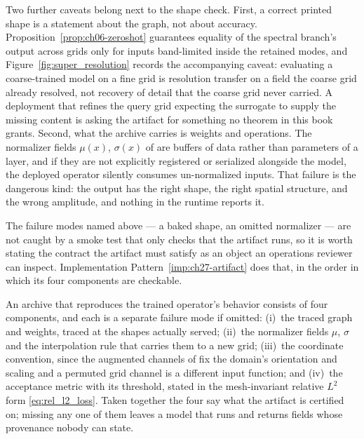 Two further caveats belong next to the shape check. First, a correct printed
shape is a statement about the graph, not about accuracy. Proposition~\ref{prop:ch06-zeroshot}
guarantees equality of the spectral branch's output across grids only for inputs
band-limited inside the retained modes, and Figure~\ref{fig:super_resolution}
records the accompanying caveat: evaluating a coarse-trained model on a fine grid
is resolution transfer on a field the coarse grid already resolved, not recovery
of detail that the coarse grid never carried. A deployment that refines the query
grid expecting the surrogate to supply the missing content is asking the artifact
for something no theorem in this book grants. Second, what the archive carries is
weights and operations. The normalizer fields $\mu(x)$, $\sigma(x)$ of
 are buffers of data
rather than parameters of a layer, and if they are not explicitly registered or
serialized alongside the model, the deployed operator silently consumes
un-normalized inputs. That failure is the dangerous kind: the output has the
right shape, the right spatial structure, and the wrong amplitude, and nothing in
the runtime reports it.

The failure modes named above --- a baked shape, an omitted normalizer --- are not
caught by a smoke test that only checks that the artifact runs, so it is worth
stating the contract the artifact must satisfy as an object an operations reviewer
can inspect. Implementation Pattern~\ref{imp:ch27-artifact} does that, in the order
in which its four components are checkable.

\begin{implementation}
\label{imp:ch27-artifact}
An archive that reproduces the trained operator's behavior consists of four
components, and each is a separate failure mode if omitted: (i)~the traced graph
and weights, traced at the shapes actually served; (ii)~the normalizer fields
$\mu$, $\sigma$ and the interpolation rule that carries them to a new grid;
(iii)~the coordinate convention, since the augmented channels of
 fix the domain's
orientation and scaling and a permuted grid channel is a different input
function; and (iv)~the acceptance metric with its threshold, stated in the
mesh-invariant relative $L^{2}$ form \eqref{eq:rel_l2_loss}. Taken together the
four say what the artifact is certified on; missing any one of them leaves a
model that runs and returns fields whose provenance nobody can state.
\end{implementation}

